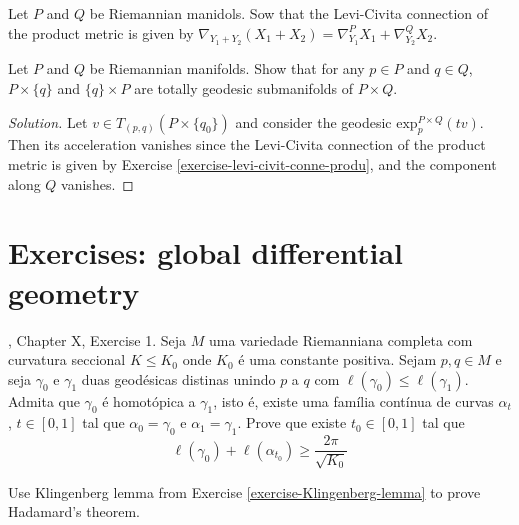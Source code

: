 \documentclass{book}
\begin{document}
\begin{exercise}
\label{exercise-levi-civit-conne-produ}
Let $P$ and $Q$ be Riemannian manidols. Sow
that the Levi-Civita connection of
the product metric is given by
$\nabla_{Y_1+Y_2}(X_1+X_2)=\nabla^P_{Y_1}X_1+
\nabla^Q_{Y_2}X_2$.
\end{exercise}

\begin{exercise}
\label{exercise-total-geode-subma-produ}
Let $P$ and $Q$ be Riemannian manifolds. Show
that for any $p \in P$ and $q \in
Q$, $P\times \{q\}$ and $\{q\}\times P$ are
totally geodesic
submanifolds of $P \times Q$.
\end{exercise}

\begin{proof}[Solution]
Let $v \in T_{(p,q)}(P\times\{q_0\})$ and
consider the geodesic
 $\text{exp}_p^{P\times Q}(tv)$. Then
its acceleration vanishes since the
Levi-Civita connection of the product metric
is given by Exercise
\ref{exercise-levi-civit-conne-produ}, and
the
component along $Q$ vanishes.
\end{proof}

\section{Exercises: global differential
geometry}
\label{section-exerc-globa-diffe-geome}

\begin{exercise}
\label{exercise-Klingenberg-lemma}
\cite{doc}, Chapter X, Exercise 1. Seja $M$
uma variedade Riemanniana
completa com curvatura seccional $K \leq
K_0$ onde $K_0$ é uma constante
positiva. Sejam $p,q \in M$ e seja $\gamma_0$
e $\gamma_1$ duas geodésicas
distinas unindo $p$ a $q$ com
$\ell(\gamma_0) \leq  \ell(\gamma_1)$.
Admita que $\gamma_0$ é homotópica a
$\gamma_1$, isto é, existe uma família
contínua de curvas $\alpha_t$, $t \in [0,1]$
tal que $\alpha_0 = \gamma_0$
e $\alpha_1=\gamma_1$. Prove que existe $t_0
\in [0,1]$ tal que
$$
\ell(\gamma_0)+\ell(\alpha_{t_0}) \geq
\frac{2\pi}{\sqrt{K_0} }
$$
\end{exercise}

\begin{exercise}
\label{exercise-Hadamard-via-Kingenberg}
Use Klingenberg lemma from Exercise
\ref{exercise-Klingenberg-lemma} to prove
Hadamard's theorem.
\end{exercise}
\end{document}
